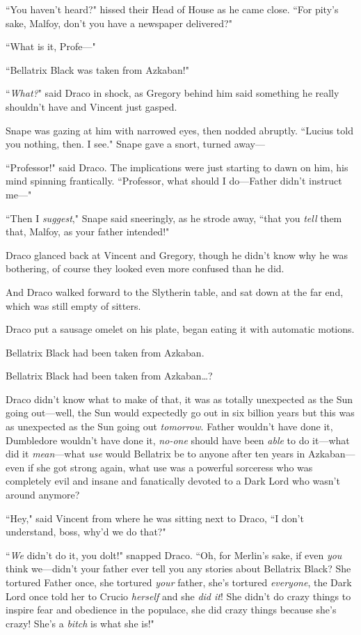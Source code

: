 ``You haven't heard?" hissed their Head of House as he came close. ``For pity's sake, Malfoy, don't you have a newspaper delivered?"

``What is it, Profe—"

``Bellatrix Black was taken from Azkaban!"

``\emph{What?}" said Draco in shock, as Gregory behind him said something he really shouldn't have and Vincent just gasped.

Snape was gazing at him with narrowed eyes, then nodded abruptly. ``Lucius told you nothing, then. I see." Snape gave a snort, turned away—

``Professor!" said Draco. The implications were just starting to dawn on him, his mind spinning frantically. ``Professor, what should I do—Father didn't instruct me—"

``Then I \emph{suggest}," Snape said sneeringly, as he strode away, ``that you \emph{tell} them that, Malfoy, as your father intended!"

Draco glanced back at Vincent and Gregory, though he didn't know why he was bothering, of course they looked even more confused than he did.

And Draco walked forward to the Slytherin table, and sat down at the far end, which was still empty of sitters.

Draco put a sausage omelet on his plate, began eating it with automatic motions.

Bellatrix Black had been taken from Azkaban.

Bellatrix Black had been taken from Azkaban{\ldots}?

Draco didn't know what to make of that, it was as totally unexpected as the Sun going out—well, the Sun would expectedly go out in six billion years but this was as unexpected as the Sun going out \emph{tomorrow}. Father wouldn't have done it, Dumbledore wouldn't have done it, \emph{no-one} should have been \emph{able} to do it—what did it \emph{mean}—what \emph{use} would Bellatrix be to anyone after ten years in Azkaban—even if she got strong again, what use was a powerful sorceress who was completely evil and insane and fanatically devoted to a Dark Lord who wasn't around anymore?

``Hey," said Vincent from where he was sitting next to Draco, ``I don't understand, boss, why'd we do that?"

``\emph{We} didn't do it, you dolt!" snapped Draco. ``Oh, for Merlin's sake, if even \emph{you} think we—didn't your father ever tell you any stories about Bellatrix Black? She tortured Father once, she tortured \emph{your} father, she's tortured \emph{everyone}, the Dark Lord once told her to Crucio \emph{herself} and she \emph{did it}! She didn't do crazy things to inspire fear and obedience in the populace, she did crazy things because she's crazy! She's a \emph{bitch} is what she is!"

